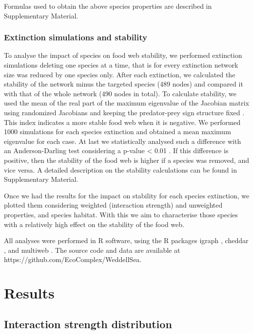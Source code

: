 \documentclass[gc, manuscript]{copernicus}
\begin{document}
Formulas used to obtain the above species properties are described in
Supplementary Material.

\subsubsection{Extinction simulations and stability}

To analyse the impact of species on food web stability, we performed
extinction simulations deleting one species at a time, that is for every
extinction network size was reduced by one species only. After each
extinction, we calculated the stability of the network minus the
targeted species (489 nodes) and compared it with that of the whole
network (490 nodes in total). To calculate stability, we used the mean
of the real part of the maximum eigenvalue of the Jacobian matrix using
randomized Jacobians and keeping the predator-prey sign structure fixed
\citep{Allesina2008, Grilli2016}. This index indicates a more stable
food web when it is negative. We performed 1000 simulations for each
species extinction and obtained a mean maximum eigenvalue for each case.
At last we statistically analysed such a difference with an
Anderson-Darling test considering a p-value \textless{} 0.01
\citep{Scholz1987}. If this difference is positive, then the stability
of the food web is higher if a species was removed, and vice versa. A
detailed description on the stability calculations can be found in
Supplementary Material.

Once we had the results for the impact on stability for each species
extinction, we plotted them considering weighted (interaction strength)
and unweighted properties, and species habitat. With this we aim to
characterise those species with a relatively high effect on the
stability of the food web.

All analyses were performed in R software, using the R packages igraph
\citep{Csardi2005}, cheddar \citep{Hudson2013}, and multiweb
\citep{Saravia2019}. The source code and data are available at
https://github.com/EcoComplex/WeddellSea.

\section{Results}

\subsection{Interaction strength distribution}
\end{document}
